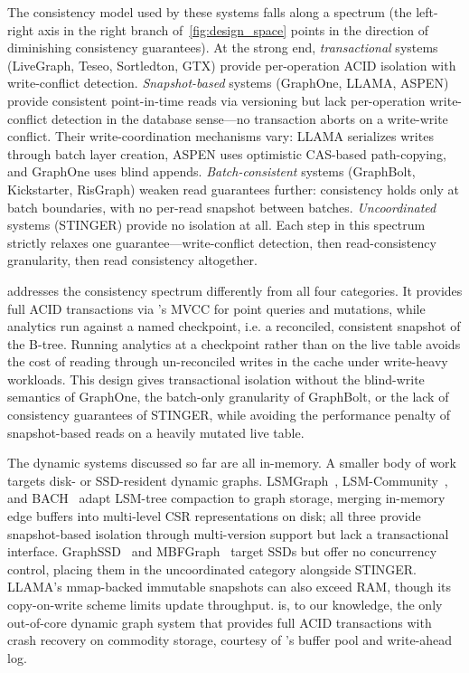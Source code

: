 The consistency model used by these systems falls along a spectrum (the left-right axis in the right branch of~\autoref{fig:design_space} points in the direction of diminishing consistency guarantees).
At the strong end, \emph{transactional} systems (LiveGraph, Teseo, Sortledton, GTX) provide per-operation ACID isolation with write-conflict detection.
\emph{Snapshot-based} systems (GraphOne, LLAMA, ASPEN) provide consistent point-in-time reads via versioning but lack per-operation write-conflict detection in the database sense---no transaction aborts on a write-write conflict.
Their write-coordination mechanisms vary: LLAMA serializes writes through batch layer creation, ASPEN uses optimistic CAS-based path-copying, and GraphOne uses blind appends.
\emph{Batch-consistent} systems (GraphBolt, Kickstarter, RisGraph) weaken read guarantees further: consistency holds only at batch boundaries, with no per-read snapshot between batches.
\emph{Uncoordinated} systems (STINGER) provide no isolation at all.
Each step in this spectrum strictly relaxes one guarantee---write-conflict detection, then read-consistency granularity, then read consistency altogether.

\project{} addresses the consistency spectrum differently from all four categories.
It provides full ACID transactions via \wt{}'s MVCC for point queries and mutations, while analytics run against a named checkpoint, i.e. a reconciled, consistent snapshot of the B-tree.
Running analytics at a checkpoint rather than on the live table avoids the cost of reading through un-reconciled writes in the cache under write-heavy workloads.
This design gives \project{} transactional isolation without the blind-write semantics of GraphOne, the batch-only granularity of GraphBolt, or the lack of consistency guarantees of STINGER, while avoiding the performance penalty of snapshot-based reads on a heavily mutated live table.

The dynamic systems discussed so far are all in-memory.
A smaller body of work targets disk- or SSD-resident dynamic graphs.
LSMGraph~\cite{yu2024lsmgraph}, LSM-Community~\cite{wang2025lsmcommunity}, and BACH~\cite{huang2026bach} adapt LSM-tree compaction to graph storage, merging in-memory edge buffers into multi-level CSR representations on disk; all three provide snapshot-based isolation through multi-version support but lack a transactional interface.
GraphSSD~\cite{matam2019graphssd} and MBFGraph~\cite{liu2023mbfgraph} target SSDs but offer no concurrency control, placing them in the uncoordinated category alongside STINGER.
LLAMA's mmap-backed immutable snapshots can also exceed RAM, though its copy-on-write scheme limits update throughput.
\project{} is, to our knowledge, the only out-of-core dynamic graph system that provides full ACID transactions with crash recovery on commodity storage, courtesy of \wt{}'s buffer pool and write-ahead log.

